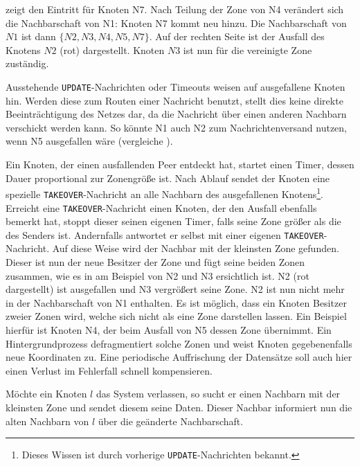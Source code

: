  zeigt den Eintritt für Knoten N7. Nach Teilung der Zone von N4 verändert sich die Nachbarschaft von N1: Knoten N7 kommt neu hinzu. Die Nachbarschaft von $N1$ ist dann $\{N2, N3, N4, N5, N7\}$. Auf der rechten Seite ist der Ausfall des Knotens $N2$ (rot) dargestellt. Knoten $N3$ ist nun für die vereinigte Zone zuständig.

Ausstehende \texttt{UPDATE}-Nachrichten oder Timeouts weisen auf ausgefallene Knoten hin. Werden diese zum Routen einer Nachricht benutzt, stellt dies keine direkte Beeinträchtigung des Netzes dar, da die Nachricht über einen anderen Nachbarn verschickt werden kann. So könnte N1 auch N2 zum Nachrichtenversand nutzen, wenn N5 ausgefallen wäre (vergleiche ).

Ein Knoten, der einen ausfallenden Peer entdeckt hat, startet einen Timer, dessen Dauer proportional zur Zonengröße ist. Nach Ablauf sendet der Knoten eine spezielle \texttt{TAKEOVER}-Nachricht an alle Nachbarn des ausgefallenen Knotens\footnote{Dieses Wissen ist durch vorherige \texttt{UPDATE}-Nachrichten bekannt.}. Erreicht eine \texttt{TAKEOVER}-Nachricht einen Knoten, der den Ausfall ebenfalls bemerkt hat, stoppt dieser seinen eigenen Timer, falls seine Zone größer als die des Senders ist. Andernfalls antwortet er selbst mit einer eigenen \texttt{TAKEOVER}-Nachricht. Auf diese Weise wird der Nachbar mit der kleinsten Zone gefunden. Dieser ist nun der neue Besitzer der Zone und fügt seine beiden Zonen zusammen, wie es in  am Beispiel von N2 und N3 ersichtlich ist. N2 (rot dargestellt) ist ausgefallen und N3 vergrößert seine Zone. N2 ist nun nicht mehr in der Nachbarschaft von N1 enthalten. Es ist möglich, dass ein Knoten Besitzer zweier Zonen wird, welche sich nicht als eine Zone darstellen lassen. Ein Beispiel hierfür ist Knoten N4, der beim Ausfall von N5 dessen Zone übernimmt. Ein Hintergrundprozess defragmentiert solche Zonen und weist Knoten gegebenenfalls neue Koordinaten zu. Eine periodische Auffrischung der Datensätze soll auch hier einen Verlust im Fehlerfall schnell kompensieren.

Möchte ein Knoten $l$ das System verlassen, so sucht er einen Nachbarn mit der kleinsten Zone und sendet diesem seine Daten. Dieser Nachbar informiert nun die alten Nachbarn von $l$ über die geänderte Nachbarschaft.
